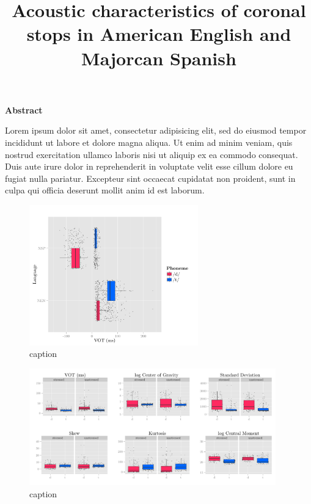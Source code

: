 \documentclass[12pt]{article}
\title{Acoustic characteristics of coronal stops in American English and Majorcan Spanish}
\date{}
\author{}
\begin{document}

\maketitle

\vspace{-.8in}

\begin{center}
	\textbf{Abstract}
\end{center}



	Lorem ipsum dolor sit amet, consectetur adipisicing elit, sed do eiusmod
	tempor incididunt ut labore et dolore magna aliqua. Ut enim ad minim veniam,
	quis nostrud exercitation ullamco laboris nisi ut aliquip ex ea commodo
	consequat. Duis aute irure dolor in reprehenderit in voluptate velit esse
	cillum dolore eu fugiat nulla pariatur. Excepteur sint occaecat cupidatat non
	proident, sunt in culpa qui officia deserunt mollit anim id est laborum.











\clearpage

\begin{figure}[ht]
	\centering
	\includegraphics[width=0.65\textwidth]{../figures/vot.pdf}
	\caption{caption}
	\label{fig:vot_all}
\end{figure}

\begin{figure}[ht]
	\centering
	\includegraphics[width=0.95\textwidth]{../figures/dt_all.pdf}
	\caption{caption}
	\label{fig:spectral_moments}
\end{figure}

\singlespace

\nocite{*}



\end{document}

